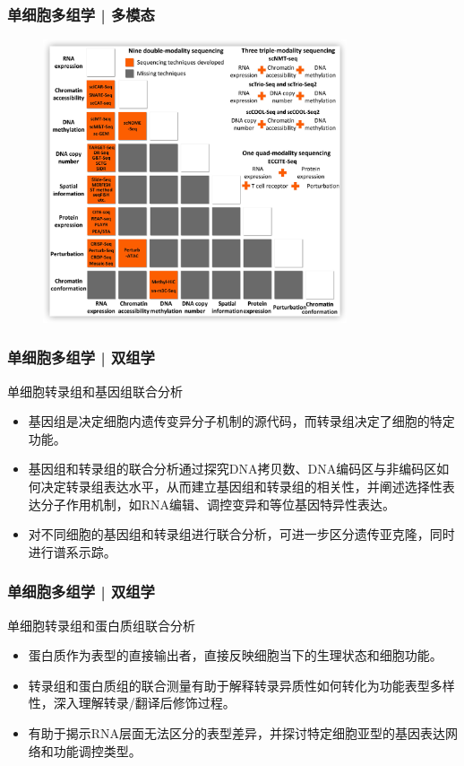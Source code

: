\documentclass[11pt]{ctexbeamer}
\begin{document}
\begin{frame}
	\frametitle{单细胞多组学 | 多模态}
	\begin{figure}
		\includegraphics[width=0.8\textwidth]{multimodel_01.png}
	\end{figure}
\end{frame}

\begin{frame}
	\frametitle{单细胞多组学 | 双组学}
	\begin{block}{单细胞转录组和基因组联合分析}
		\begin{itemize}
			\item 基因组是决定细胞内遗传变异分子机制的源代码，而转录组决定了细胞的特定功能。
			\item 基因组和转录组的联合分析通过探究DNA拷贝数、DNA编码区与非编码区如何决定转录组表达水平，从而建立基因组和转录组的相关性，并阐述选择性表达分子作用机制，如RNA编辑、调控变异和等位基因特异性表达。
			\item 对不同细胞的基因组和转录组进行联合分析，可进一步\alert{区分遗传亚克隆}，同时进行谱系示踪。
		\end{itemize}
	\end{block}
\end{frame}

\begin{frame}
	\frametitle{单细胞多组学 | 双组学}
		\begin{block}{单细胞转录组和蛋白质组联合分析}
					\begin{itemize}
				\item 蛋白质作为表型的直接输出者，直接反映细胞当下的生理状态和细胞功能。
				\item 转录组和蛋白质组的联合测量有助于解释转录异质性如何转化为功能表型多样性，深入理解转录/翻译后修饰过程。
				\item 有助于\alert{揭示RNA层面无法区分的表型差异}，并探讨特定细胞亚型的基因表达网络和功能调控类型。
			\end{itemize}
	\end{block}
\end{frame}
\end{document}
